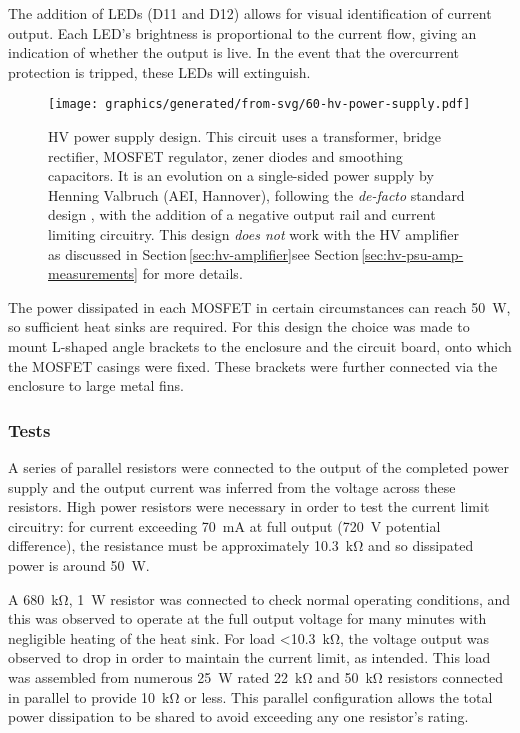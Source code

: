 The addition of \glspl{LED} (D11 and D12) allows for visual identification of current output. Each \gls{LED}'s brightness is proportional to the current flow, giving an indication of whether the output is live. In the event that the overcurrent protection is tripped, these \glspl{LED} will extinguish.

\begin{figure}
  \centering
  \texttt{[image: graphics/generated/from-svg/60-hv-power-supply.pdf]}
  \caption{\gls{HV} power supply design. This circuit uses a transformer, bridge rectifier, \gls{MOSFET} regulator, zener diodes and smoothing capacitors. It is an evolution on a single-sided power supply by Henning Valbruch (AEI, Hannover), following the \emph{de-facto} standard design \cite{Horowitz2015}, with the addition of a negative output rail and current limiting circuitry. This design \emph{does not} work with the \gls{HV} amplifier as discussed in Section\,\ref{sec:hv-amplifier}\textemdash see Section\,\ref{sec:hv-psu-amp-measurements} for more details.}
  \label{fig:hv-power-supply}
\end{figure}

The power dissipated in each \gls{MOSFET} in certain circumstances can reach \SI{50}{\watt}, so sufficient heat sinks are required. For this design the choice was made to mount L-shaped angle brackets to the enclosure and the circuit board, onto which the \gls{MOSFET} casings were fixed. These brackets were further connected via the enclosure to large metal fins. 

\subsubsection{\label{sec:hv-psu-tests}Tests}

A series of parallel resistors were connected to the output of the completed power supply and the output current was inferred from the voltage across these resistors. High power resistors were necessary in order to test the current limit circuitry: for current exceeding \SI{70}{\milli\ampere} at full output (\SI{720}{\volt} potential difference), the resistance must be approximately \SI{10.3}{\kilo\ohm} and so dissipated power is around \SI{50}{\watt}.

A \SI{680}{\kilo\ohm}, \SI{1}{\watt} resistor was connected to check normal operating conditions, and this was observed to operate at the full output voltage for many minutes with negligible heating of the heat sink. For load \SI{<10.3}{\kilo\ohm}, the voltage output was observed to drop in order to maintain the current limit, as intended. This load was assembled from numerous \SI{25}{\watt} rated \SI{22}{\kilo\ohm} and \SI{50}{\kilo\ohm} resistors connected in parallel to provide \SI{10}{\kilo\ohm} or less. This parallel configuration allows the total power dissipation to be shared to avoid exceeding any one resistor's rating.


